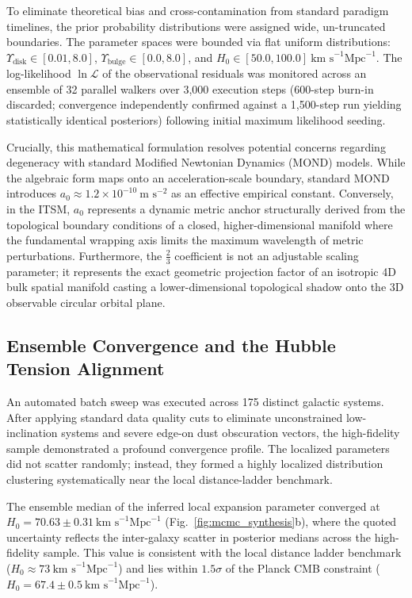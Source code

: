 \documentclass[aps,prd,10pt,twocolumn,superscriptaddress,nofootinbib]{revtex4-2}
\begin{document}
To eliminate theoretical bias and cross-contamination from standard paradigm timelines, the prior probability distributions were assigned wide, un-truncated boundaries. The parameter spaces were bounded via flat uniform distributions: $\Upsilon_{\text{disk}} \in [0.01, 8.0]$, $\Upsilon_{\text{bulge}} \in [0.0, 8.0]$, and $H_0 \in [50.0, 100.0] \ \text{km s}^{-1} \text{Mpc}^{-1}$. The log-likelihood $\ln \mathcal{L}$ of the observational residuals was monitored across an ensemble of 32 parallel walkers over 3,000 execution steps (600-step burn-in discarded; convergence independently confirmed against a 1,500-step run yielding statistically identical posteriors) following initial maximum likelihood seeding.

Crucially, this mathematical formulation resolves potential concerns regarding degeneracy with standard Modified Newtonian Dynamics (MOND) models. While the algebraic form maps onto an acceleration-scale boundary, standard MOND introduces $a_0 \approx 1.2 \times 10^{-10} \ \text{m s}^{-2}$ as an effective empirical constant. Conversely, in the ITSM, $a_0$ represents a dynamic metric anchor structurally derived from the topological boundary conditions of a closed, higher-dimensional manifold where the fundamental wrapping axis limits the maximum wavelength of metric perturbations. Furthermore, the $\frac{2}{3}$ coefficient is not an adjustable scaling parameter; it represents the exact geometric projection factor of an isotropic 4D bulk spatial manifold casting a lower-dimensional topological shadow onto the 3D observable circular orbital plane.

\subsection{Ensemble Convergence and the Hubble Tension Alignment}

An automated batch sweep was executed across 175 distinct galactic systems. After applying standard data quality cuts to eliminate unconstrained low-inclination systems and severe edge-on dust obscuration vectors, the high-fidelity sample demonstrated a profound convergence profile. The localized parameters did not scatter randomly; instead, they formed a highly localized distribution clustering systematically near the local distance-ladder benchmark.

The ensemble median of the inferred local expansion parameter converged at $H_0 = 70.63 \pm 0.31 \ \text{km s}^{-1} \text{Mpc}^{-1}$ (Fig.~\ref{fig:mcmc_synthesis}b), where the quoted uncertainty reflects the inter-galaxy scatter in posterior medians across the high-fidelity sample. This value is consistent with the local distance ladder benchmark ($H_0 \approx 73 \ \text{km s}^{-1} \text{Mpc}^{-1}$) and lies within $1.5\sigma$ of the Planck CMB constraint ($H_0 = 67.4 \pm 0.5 \ \text{km s}^{-1} \text{Mpc}^{-1}$).
\end{document}
